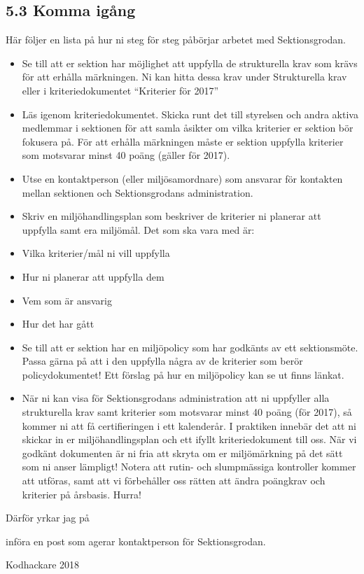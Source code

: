 \documentclass[../_main/handlingar.tex]{subfiles}
\begin{document}
\subsection{5.3 Komma igång}
Här följer en lista på hur ni steg för steg påbörjar arbetet med Sektionsgrodan.
\begin{itemize}
\item Se till att er sektion har möjlighet att uppfylla de strukturella krav som krävs för att erhålla märkningen. Ni kan hitta dessa krav under Strukturella krav eller i kriteriedokumentet “Kriterier för 2017”    
\item Läs igenom kriteriedokumentet. Skicka runt det till styrelsen och andra aktiva medlemmar i sektionen för att samla åsikter om vilka kriterier er sektion bör fokusera på. För att erhålla märkningen måste er sektion uppfylla kriterier som motsvarar minst 40 poäng (gäller för 2017).
\item Utse en kontaktperson (eller miljösamordnare) som ansvarar för kontakten mellan sektionen och Sektionsgrodans administration.
\item Skriv en miljöhandlingsplan som beskriver de kriterier ni planerar att uppfylla samt era miljömål. Det som ska vara med är:
\item Vilka kriterier/mål ni vill uppfylla
\item Hur ni planerar att uppfylla dem
\item Vem som är ansvarig
\item Hur det har gått
\item Se till att er sektion har en miljöpolicy som har godkänts av ett sektionsmöte. Passa gärna på att i den uppfylla några av de kriterier som berör policydokumentet! Ett förslag på hur en miljöpolicy kan se ut finns länkat.
\item När ni kan visa för Sektionsgrodans administration att ni uppfyller alla strukturella krav samt kriterier som motsvarar minst 40 poäng (för 2017), så kommer ni att få certifieringen i ett kalenderår. I praktiken innebär det att ni skickar in er miljöhandlingsplan och ett ifyllt kriteriedokument till oss. När vi godkänt dokumenten är ni fria att skryta om er miljömärkning på det sätt som ni anser lämpligt! Notera att rutin- och slumpmässiga kontroller kommer att utföras, samt att vi förbehåller oss rätten att ändra poängkrav och kriterier på årsbasis. Hurra!
\end{itemize}

Därför yrkar jag på
\begin{attsatser}
\att införa en post som agerar kontaktperson för Sektionsgrodan.
\end{attsatser}
\begin{signatures}{1}
    \mvh
    \signature{Hannes Byden}{Kodhackare 2018}
\end{signatures}
\end{document}

